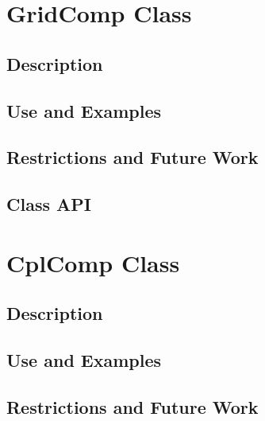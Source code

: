\documentclass[english]{article}
\begin{document}
\section{GridComp Class}
\subsection{Description}

%
%
\subsection{Use and Examples}




\subsection{Restrictions and Future Work}

\subsection{Class API}

\section{CplComp Class}
\subsection{Description}

\subsection{Use and Examples}


\subsection{Restrictions and Future Work}

\end{document}

